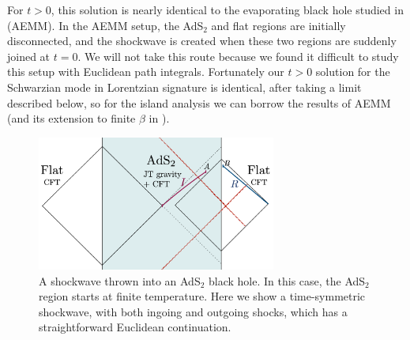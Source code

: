 \documentclass[11pt,oneside,letterpaper]{article}
\numberwithin{equation}{section}
\begin{document}
\begin{spacing}{1.1}
For $t>0$, this solution is nearly identical to the evaporating black hole studied in \cite{Almheiri:2019psf} (AEMM). In the AEMM setup, the AdS$_2$ and flat regions are initially disconnected, and the shockwave is created when these two regions are suddenly joined at $t=0$. We will not take this route because we found it difficult to study this setup with Euclidean path integrals.  Fortunately our $t>0$ solution for the Schwarzian mode in Lorentzian signature is identical, after taking a limit described below, so for the island analysis we can borrow the results of AEMM (and its extension to finite $\beta$ in \cite{Chen:2020jvn,Hollowood:2020kvk,Hollowood:2020cou  }).
\begin{figure}
      \begin{center}
 \includegraphics[width=0.7\textwidth]{figures/Island_evap.png}
  \caption{\small
  A shockwave thrown into an AdS$_2$ black hole. In this case, the AdS$_2$ region starts at finite temperature. Here we show a time-symmetric shockwave, with both ingoing and outgoing shocks, which has a straightforward Euclidean continuation.
  }
  \label{fig:setup-twosided2}
 \end{center}
 \end{figure}


\end{spacing}
\end{document}
